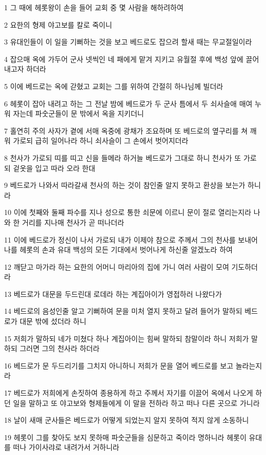 \par 1 그 때에 헤롯왕이 손을 들어 교회 중 몇 사람을 해하려하여
\par 2 요한의 형제 야고보를 칼로 죽이니
\par 3 유대인들이 이 일을 기뻐하는 것을 보고 베드로도 잡으려 할새 때는 무교절일이라
\par 4 잡으매 옥에 가두어 군사 넷씩인 네 패에게 맡겨 지키고 유월절 후에 백성 앞에 끌어 내고자 하더라
\par 5 이에 베드로는 옥에 갇혔고 교회는 그를 위하여 간절히 하나님께 빌더라
\par 6 헤롯이 잡아 내려고 하는 그 전날 밤에 베드로가 두 군사 틈에서 두 쇠사슬애 매여 누워 자는데 파숫군들이 문 밖에서 옥을 지키더니
\par 7 홀연히 주의 사자가 곁에 서매 옥중에 광채가 조요하며 또 베드로의 옆구리를 쳐 깨워 가로되 급히 일어나라 하니 쇠사슬이 그 손에서 벗어지더라
\par 8 천사가 가로되 띠를 띠고 신을 들메라 하거늘 베드로가 그대로 하니 천사가 또 가로되 겉옷을 입고 따라 오라 한대
\par 9 베드로가 나와서 따라갈새 천사의 하는 것이 참인줄 알지 못하고 환상을 보는가 하니라
\par 10 이에 첫째와 둘째 파수를 지나 성으로 통한 쇠문에 이르니 문이 절로 열리는지라 나와 한 거리를 지나매 천사가 곧 떠나더라
\par 11 이에 베드로가 정신이 나서 가로되 내가 이제야 참으로 주께서 그의 천사를 보내어 나를 헤롯의 손과 유대 백성의 모든 기대에서 벗어나게 하신줄 알겠노라 하여
\par 12 깨닫고 마가라 하는 요한의 어머니 마리아의 집에 가니 여러 사람이 모여 기도하더라
\par 13 베드로가 대문을 두드린대 로데라 하는 계집아이가 영접하러 나왔다가
\par 14 베드로의 음성인줄 알고 기뻐하여 문을 미처 열지 못하고 달려 들어가 말하되 베드로가 대문 밖에 섰더라 하니
\par 15 저희가 말하되 네가 미쳤다 하나 계집아이는 힘써 말하되 참말이라 하니 저희가 말하되 그러면 그의 천사라 하더라
\par 16 베드로가 문 두드리기를 그치지 아니하니 저희가 문을 열어 베드로를 보고 놀라는지라
\par 17 베드로가 저희에게 손짓하여 종용하게 하고 주께서 자기를 이끌어 옥에서 나오게 하던 일을 말하고 또 야고보와 형제들에게 이 말을 전하라 하고 떠나 다른 곳으로 가니라
\par 18 날이 새매 군사들은 베드로가 어떻게 되었는지 알지 못하여 적지 않게 소동하니
\par 19 헤롯이 그를 찾아도 보지 못하매 파숫군들을 심문하고 죽이라 명하니라 헤롯이 유대를 떠나 가이사랴로 내려가서 거하니라
